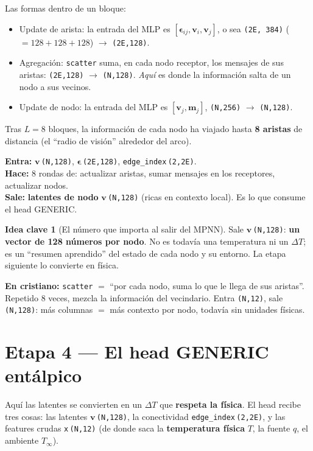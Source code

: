 \documentclass[11pt]{article}
\newcommand{\Tinf}{T_{\infty}}
\newcommand{\shp}[1]{{\color{shapecol}\texttt{(#1)}}}   %
\theoremstyle{definition}
\newtheorem{idea}{Idea clave}[section]
\newcommand{\dummies}[1]{%
  \par\smallskip\noindent
  \colorbox{yellow!18}{\parbox{\dimexpr\linewidth-2\fboxsep}{%
  \small\textbf{En cristiano:} #1}}\par\smallskip}
\newcommand{\io}[3]{%
  \par\smallskip\noindent
  \colorbox{blue!6}{\parbox{\dimexpr\linewidth-2\fboxsep}{\small
  \textbf{Entra:} #1 \\ \textbf{Hace:} #2 \\ \textbf{Sale:} #3}}\par\smallskip}
\begin{document}
Las formas dentro de un bloque:
\begin{itemize}[leftmargin=1.4em]
  \item Update de arista: la entrada del MLP es $[\bm\epsilon_{ij},\bm v_i,\bm v_j]$,
  o sea \shp{2E, 384} ($=128{+}128{+}128$) $\to$ \shp{2E,128}.
  \item Agregación: \texttt{scatter} suma, en cada nodo receptor, los mensajes de sus
  aristas: \shp{2E,128} $\to$ \shp{N,128}. \emph{Aquí} es donde la información salta
  de un nodo a sus vecinos.
  \item Update de nodo: la entrada del MLP es $[\bm v_j,\bm m_j]$, \shp{N,256} $\to$
  \shp{N,128}.
\end{itemize}
Tras $L{=}8$ bloques, la información de cada nodo ha viajado hasta \textbf{8 aristas}
de distancia (el ``radio de visión'' alrededor del arco).

\io{$\bm v$\,\shp{N,128}, $\bm\epsilon$\,\shp{2E,128}, \texttt{edge\_index}\,\shp{2,2E}.}
{8 rondas de: actualizar aristas, sumar mensajes en los receptores, actualizar nodos.}
{\textbf{latentes de nodo} $\bm v$\,\shp{N,128} (ricas en contexto local). Es lo que
consume el head GENERIC.}

\begin{idea}[El número que importa al salir del MPNN]
Sale $\bm v$\,\shp{N,128}: \textbf{un vector de 128 números por nodo}. No es todavía
una temperatura ni un $\Delta T$; es un ``resumen aprendido'' del estado de cada nodo
y su entorno. La etapa siguiente lo convierte en física.
\end{idea}

\dummies{\texttt{scatter} $=$ ``por cada nodo, suma lo que le llega de sus aristas''.
Repetido 8 veces, mezcla la información del vecindario. Entra \shp{N,12}, sale
\shp{N,128}: más columnas $=$ más contexto por nodo, todavía sin unidades físicas.}

\section{Etapa 4 — El head GENERIC entálpico}
\label{sec:gen}

Aquí las latentes se convierten en un $\Delta T$ que \textbf{respeta la física}. El
head recibe tres cosas: las latentes $\bm v$\,\shp{N,128}, la conectividad
\texttt{edge\_index}\,\shp{2,2E}, y las features crudas \texttt{x}\,\shp{N,12} (de
donde saca la \textbf{temperatura física} $T$, la fuente $q$, el ambiente $\Tinf$).
\end{document}
